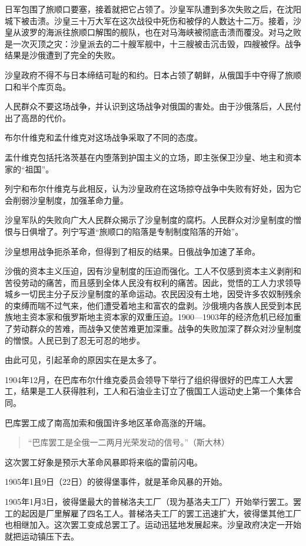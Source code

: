 日军包围了旅顺口要塞，接着就把它占领了。沙皇军队遭到多次失败之后，在沈阳城下被击溃。沙皇三十万大军在这次战役中死伤和被俘的人数达十二万。接着，沙皇从波罗的海派往旅顺口解围的舰队，也在对马海峡被彻底击溃而覆没。对马之败是一次灭顶之灾：沙皇派去的二十艘军舰中，十三艘被击沉击毁，四艘被俘。战争结果是沙俄遭到了完全的失败。

沙皇政府不得不与日本缔结可耻的和约。日本占领了朝鲜，从俄国手中夺得了旅顺口和半个库页岛。

人民群众不要这场战争，并认识到这场战争对俄国的害处。由于沙俄落后，人民付出了高昂的代价。

布尔什维克和孟什维克对这场战争采取了不同的态度。

盂什维克包括托洛茨基在内堕落到护国主义的立场，即主张保卫沙皇、地主和资本家的“祖国”。

列宁和布尔什维克与此相反，认为沙皇政府在这场掠夺战争中失败有好处，因为它会削弱沙皇制度，加强革命力量。

沙皇军队的失败向广大人民群众揭示了沙皇制度的腐朽。人民群众对沙皇制度的憎恨与日俱增了。列宁写道“旅顺口的陷落是专制制度陷落的开始”。

沙皇想用战争扼杀革命，但得到了相反的结果。日俄战争加速了革命。

沙俄的资本主义压迫，因有沙皇制度的压迫而强化。工人不仅感到资本主义剥削和苦役劳动的痛苦，而且感到全体人民没有权利的痛苦。因此，觉悟的工人力求领导城乡一切民主分子反沙皇制度的革命运动。农民因没有土地，因受许多农奴制残余的束缚而喘不过气来，他们遭受着地主和富农的盘剥。沙俄境内各族人民受到本民族地主资本家和俄罗斯地主资本家的双重压迫。1900—1903年的经济危机已经加重了劳动群众的苦难，而战争又使苦难更加深重。战争的失败加深了群众对沙皇制度的憎恨。人民已到了忍无可忍的地步。

由此可见，引起革命的原因实在是太多了。

1904年12月，在巴库布尔什维克委员会领导下举行了组织得很好的巴库工人大罢工，结果是工人获得胜利，工人和石油业主订立了俄国工人运动史上第一个集体合同。

巴库罢工成了南高加索和俄国许多地区革命高涨的开端。

\begin{quotation}
“巴库罢工是全俄一二两月光荣发动的信号。”（斯大林）
\end{quotation}

这次罢工好象是预示大革命风暴即将来临的雷前闪电。

1905年1且9日（22日）的彼得堡事件，就是革命风暴的开始。

1905年1月3日，彼得堡最大的普梯洛夫工厂（现为基洛夫工厂）开始举行罢工。罢工的起因是厂里解雇了四名工人。普梯洛夫工厂的罢工迅速扩大，彼得堡其他工厂也相继加入。这次罢工变成总罢工了。运动迅猛地发展起来。沙皇政府决定一开始就把运动镇压下去。

